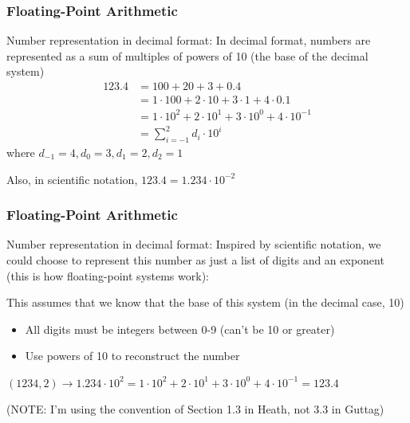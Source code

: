 \documentclass{beamer}
\begin{document}
\begin{frame}	
	\frametitle{Floating-Point Arithmetic}
	
	\begin{block}{Number representation in decimal format:}
		In decimal format, numbers are represented as a sum of multiples of powers of 10 (the base of the decimal system)
		\begin{equation*}
			\begin{split}
				123.4 	& = 100 + 20 + 3 + 0.4\\
						& = 1\cdot100 + 2\cdot 10+3\cdot1 + 4\cdot0.1 \\
						& = 1\cdot10^2 + 2\cdot10^1+3\cdot10^0 + 4\cdot10^{-1}\\
						& = \sum_{i=-1}^2 d_i \cdot 10^i
			\end{split}
		\end{equation*}
		where $d_{-1}=4, d_0=3, d_1=2,d_2=1$
		
		\vspace{10pt}
		
		Also, in scientific notation, $123.4 = 1.234\cdot10^{-2}$
	\end{block}
	
\end{frame}

\begin{frame}	
	\frametitle{Floating-Point Arithmetic}
	
	\begin{block}{Number representation in decimal format:}
		Inspired by scientific notation, we could choose to represent this number as just a list of digits and an exponent (this is how floating-point systems work):
		
		\vspace{10pt}
		This assumes that we know that the base of this system (in the decimal case, 10)
		\begin{itemize}
			\item All digits must be integers between 0-9 (can't be 10 or greater)
			\item Use powers of 10 to reconstruct the number
		\end{itemize}
		
		\vspace{10pt}
		$(1234, 2) \rightarrow 1.234\cdot10^{2} = 1\cdot10^2 + 2\cdot10^1+3\cdot10^0 + 4\cdot10^{-1} = 123.4$
		
		\vspace{10pt}
		(NOTE: I'm using the convention of Section 1.3 in Heath, not 3.3 in Guttag)
	\end{block}
	
\end{frame}
\end{document}
